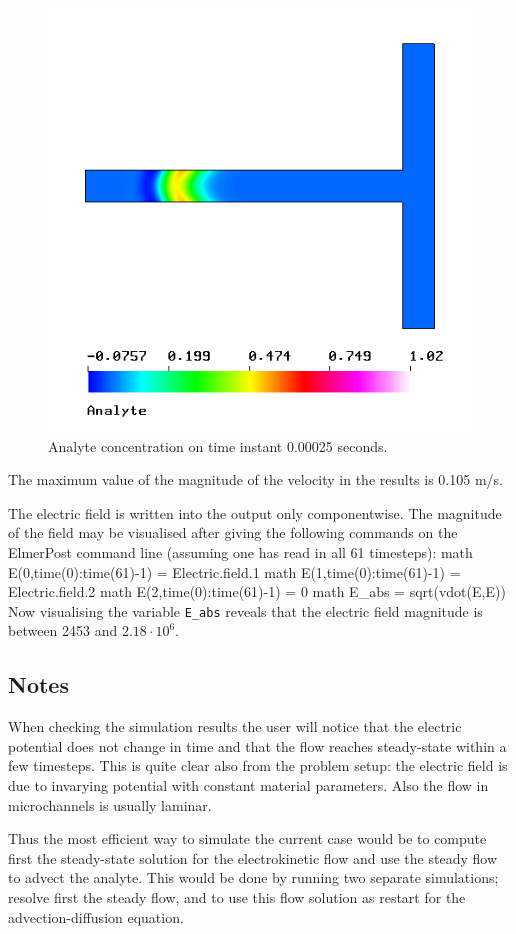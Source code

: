 \begin{figure}[bht]
\begin{center}
  \includegraphics[height=0.55\textwidth]{analyte_tutorial.png}
\end{center}
\caption{Analyte concentration on time instant 0.00025 seconds.}
\label{fig:analyte_ek}
\end{figure}
 
The maximum value of the magnitude of the velocity in the results is
0.105 m/s.

The electric field is written into the output only componentwise. The
magnitude of the field may be visualised after giving the following
commands on the ElmerPost command line (assuming one has read in all
61 timesteps):
%
\ttbegin
math E(0,time(0):time(61)-1) = Electric.field.1
math E(1,time(0):time(61)-1) = Electric.field.2
math E(2,time(0):time(61)-1) = 0
math E_abs = sqrt(vdot(E,E))
\ttend
%
Now visualising the variable \texttt{E\_abs} reveals that the electric
field magnitude is between 2453 and $2.18\cdot10^6$.


\subsection*{Notes}

When checking the simulation results the user will notice that the
electric potential does not change in time and that the flow reaches
steady-state within a few timesteps. This is quite clear also from the
problem setup: the electric field is due to invarying potential with
constant material parameters. Also the flow in microchannels is
usually laminar.

Thus the most efficient way to simulate the current case would be to
compute first the steady-state solution for the electrokinetic flow
and use the steady flow to advect the analyte. This would be done by
running two separate simulations; resolve first the steady flow,
and to use this flow solution as restart for the advection-diffusion
equation.



\hfill